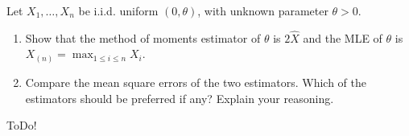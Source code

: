 
\begin{exercise}

Let $X_1, \dots, X_n$ be i.i.d. uniform $(0, \theta)$, with unknown parameter $\theta > 0$.

\begin{enumerate}[label = (\alph*)]

    \item Show that the method of moments estimator of $\theta$ is $2 \hat X$ and the MLE of $\theta$ is $X_{(n)} = \max_{1 \leq i \leq n} X_i$.

    \item Compare the mean square errors of the two estimators.
    Which of the estimators should be preferred if any?
    Explain your reasoning.

\end{enumerate}

\end{exercise}


\begin{solution}

ToDo!

\end{solution}

